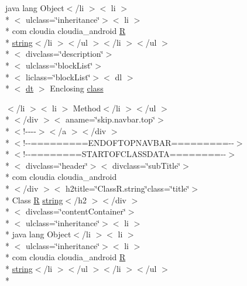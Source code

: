\begin{DoxyCompactItemize}
 java lang Object$<$/li $>$$<$ li $>$\\*
$<$ ulclass=\char`\"{}inheritance\char`\"{}$>$$<$ li $>$\\*
 com cloudia cloudia\-\_\-android \hyperlink{index-16_8html_a31e8fe59be5c20ce90a0090e28a0c1fe}{R} \\*
\hyperlink{index-17_8html_abd5fc08c07311a696bb9d8fb49da0fed}{string}$<$/li $>$$<$/ul $>$$<$/li $>$$<$/ul $>$\\*
$<$ divclass=\char`\"{}description\char`\"{}$>$\\*
$<$ ulclass=\char`\"{}block\-List\char`\"{}$>$\\*
$<$ liclass=\char`\"{}block\-List\char`\"{}$>$$<$ dl $>$\\*
$<$ \hyperlink{stylesheet_8css_a107565fb4039d33b041380d6e0ea1d80}{dt} $>$ Enclosing \hyperlink{_r_8string_8html_a3fda7575aa5ef6a3f7a85658b18a4860}{class}
\item 
$<$/li $>$$<$ li $>$ Method$<$/li $>$$<$/ul $>$\\*
$<$/div $>$$<$ aname=\char`\"{}skip.\-navbar.\-top\char`\"{}$>$\\*
$<$!-\/-\/-\/-\/$>$$<$/a $>$$<$/div $>$\\*
$<$!-\/-\/=========E\-N\-D\-O\-F\-T\-O\-P\-N\-A\-V\-B\-A\-R=========-\/-\/$>$\\*
$<$!-\/-\/========S\-T\-A\-R\-T\-O\-F\-C\-L\-A\-S\-S\-D\-A\-T\-A========-\/-\/$>$\\*
$<$ divclass=\char`\"{}header\char`\"{}$>$$<$ divclass=\char`\"{}sub\-Title\char`\"{}$>$\\*
 com cloudia cloudia\-\_\-android\\*
$<$/div $>$$<$ h2title=\char`\"{}Class\-R.\-string\char`\"{}class=\char`\"{}title\char`\"{}$>$\\*
 Class \hyperlink{index-16_8html_a31e8fe59be5c20ce90a0090e28a0c1fe}{R} \hyperlink{index-17_8html_abd5fc08c07311a696bb9d8fb49da0fed}{string}$<$/h2 $>$$<$/div $>$\\*
$<$ divclass=\char`\"{}content\-Container\char`\"{}$>$\\*
$<$ ulclass=\char`\"{}inheritance\char`\"{}$>$$<$ li $>$\\*
 java lang Object$<$/li $>$$<$ li $>$\\*
$<$ ulclass=\char`\"{}inheritance\char`\"{}$>$$<$ li $>$\\*
 com cloudia cloudia\-\_\-android \hyperlink{index-16_8html_a31e8fe59be5c20ce90a0090e28a0c1fe}{R} \\*
\hyperlink{index-17_8html_abd5fc08c07311a696bb9d8fb49da0fed}{string}$<$/li $>$$<$/ul $>$$<$/li $>$$<$/ul $>$\\*

\end{DoxyCompactItemize}
